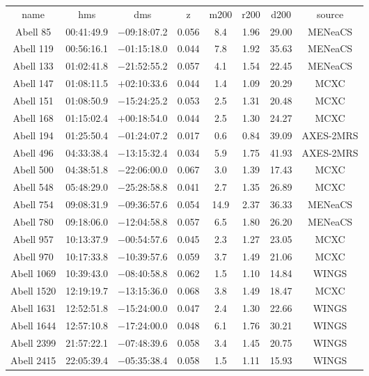 \begin{table}
\begin{tabular}{cccccccc}
name & hms & dms & z & m200 & r200 & d200 & source \\
Abell 85 & 00:41:49.9 & $-$09:18:07.2 & 0.056 & 8.4 & 1.96 & 29.00 & MENeaCS \\
Abell 119 & 00:56:16.1 & $-$01:15:18.0 & 0.044 & 7.8 & 1.92 & 35.63 & MENeaCS \\
Abell 133 & 01:02:41.8 & $-$21:52:55.2 & 0.057 & 4.1 & 1.54 & 22.45 & MENeaCS \\
Abell 147 & 01:08:11.5 & $+$02:10:33.6 & 0.044 & 1.4 & 1.09 & 20.29 & MCXC \\
Abell 151 & 01:08:50.9 & $-$15:24:25.2 & 0.053 & 2.5 & 1.31 & 20.48 & MCXC \\
Abell 168 & 01:15:02.4 & $+$00:18:54.0 & 0.044 & 2.5 & 1.30 & 24.27 & MCXC \\
Abell 194 & 01:25:50.4 & $-$01:24:07.2 & 0.017 & 0.6 & 0.84 & 39.09 & AXES-2MRS \\
Abell 496 & 04:33:38.4 & $-$13:15:32.4 & 0.034 & 5.9 & 1.75 & 41.93 & AXES-2MRS \\
Abell 500 & 04:38:51.8 & $-$22:06:00.0 & 0.067 & 3.0 & 1.39 & 17.43 & MCXC \\
Abell 548 & 05:48:29.0 & $-$25:28:58.8 & 0.041 & 2.7 & 1.35 & 26.89 & MCXC \\
Abell 754 & 09:08:31.9 & $-$09:36:57.6 & 0.054 & 14.9 & 2.37 & 36.33 & MENeaCS \\
Abell 780 & 09:18:06.0 & $-$12:04:58.8 & 0.057 & 6.5 & 1.80 & 26.20 & MENeaCS \\
Abell 957 & 10:13:37.9 & $-$00:54:57.6 & 0.045 & 2.3 & 1.27 & 23.05 & MCXC \\
Abell 970 & 10:17:33.8 & $-$10:39:57.6 & 0.059 & 3.7 & 1.49 & 21.06 & MCXC \\
Abell 1069 & 10:39:43.0 & $-$08:40:58.8 & 0.062 & 1.5 & 1.10 & 14.84 & WINGS \\
Abell 1520 & 12:19:19.7 & $-$13:15:36.0 & 0.068 & 3.8 & 1.49 & 18.47 & MCXC \\
Abell 1631 & 12:52:51.8 & $-$15:24:00.0 & 0.047 & 2.4 & 1.30 & 22.66 & WINGS \\
Abell 1644 & 12:57:10.8 & $-$17:24:00.0 & 0.048 & 6.1 & 1.76 & 30.21 & WINGS \\
Abell 2399 & 21:57:22.1 & $-$07:48:39.6 & 0.058 & 3.4 & 1.45 & 20.75 & WINGS \\
Abell 2415 & 22:05:39.4 & $-$05:35:38.4 & 0.058 & 1.5 & 1.11 & 15.93 & WINGS \\

\end{tabular}
\end{table}
